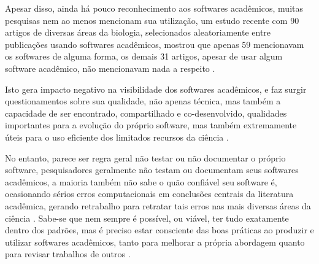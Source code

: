 
Apesar disso, ainda há pouco reconhecimento aos softwares acadêmicos, muitas
pesquisas nem ao menos mencionam sua utilização, um estudo recente com 90
artigos de diversas áreas da biologia, selecionados aleatoriamente entre
publicações usando softwares acadêmicos, mostrou que apenas 59 mencionavam os
softwares de alguma forma, os demais 31 artigos, apesar de usar algum software
acadêmico, não mencionavam nada a respeito \cite{howison2016software}.

%

Isto gera impacto negativo na visibilidade dos softwares acadêmicos, e faz
surgir questionamentos sobre sua qualidade, não apenas técnica, mas também a
capacidade de ser encontrado, compartilhado e co-desenvolvido, qualidades
importantes para a evolução do próprio software, mas também extremamente úteis
para o uso eficiente dos limitados recursos da ciência \cite{howison2013,
katz2014transitive}.

%
%
%

No entanto, parece ser regra geral não testar ou não documentar o próprio software,
pesquisadores geralmente não testam ou documentam seus softwares acadêmicos, a
maioria também não sabe o quão confiável seu software é, ocasionando sérios
erros computacionais em conclusões centrais da literatura acadêmica, gerando
retrabalho para retratar tais erros nas mais diversas áreas da ciência
\cite{Merali2010Computational}. Sabe-se que nem sempre é possível, ou viável,
ter tudo exatamente dentro dos padrões, mas é preciso estar consciente das boas
práticas ao produzir e utilizar softwares acadêmicos, tanto para melhorar a
própria abordagem quanto para revisar trabalhos de outros
\cite{wilson2014best}.

